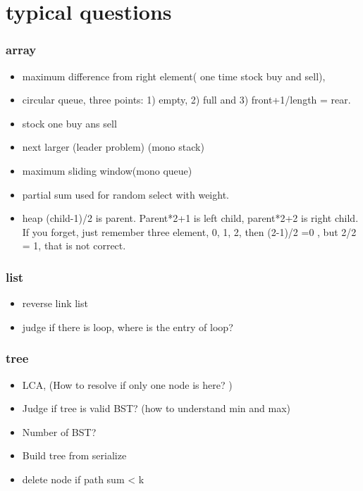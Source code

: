 \documentclass[a4paper,11pt,twoside]{book}
\begin{document}
\section{typical questions}
\subsubsection{array}
\begin{itemize}
	
	\item maximum difference from right element( one time stock buy and sell), 
	
	\item circular queue, three points: 1) empty, 2) full and 3) front+1/length = rear. 
	
	
	\item stock one buy ans sell
	\item next larger (leader problem) (mono stack)
	\item maximum sliding window(mono queue)
	\item partial sum used for random select with weight. 
	
	\item heap (child-1)/2 is parent.  Parent*2+1 is left child, parent*2+2 is right child. If you forget, just remember three element, 0, 1, 2, then  (2-1)/2 =0 , but 2/2 = 1, that is not correct. 
	
	
\end{itemize}
\subsubsection{list}
\begin{itemize}
	\item reverse link list
	\item judge if there is loop, where is the entry of loop? 
\end{itemize}

\subsubsection{tree}
\begin{itemize}
	\item LCA, (How to resolve if only one node is here? )
	\item Judge if tree is valid BST? (how to understand min and max) 
	\item Number of BST?  
	\item Build tree from serialize
	\item delete node if path sum < k
\end{itemize}
\end{document}
